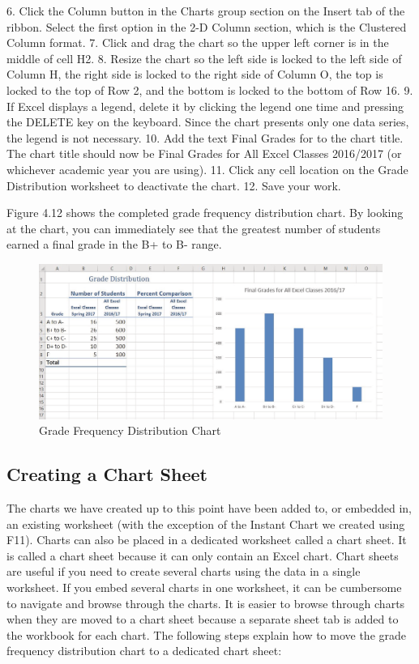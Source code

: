 6. Click the Column button in the Charts group section on the Insert tab of the ribbon. Select the
first option in the 2-D Column section, which is the Clustered Column format.
7. Click and drag the chart so the upper left corner is in the middle of cell H2.
8. Resize the chart so the left side is locked to the left side of Column H, the right side is locked to
the right side of Column O, the top is locked to the top of Row 2, and the bottom is locked to the
bottom of Row 16.
9. If Excel displays a legend, delete it by clicking the legend one time and pressing the DELETE key
on the keyboard. Since the chart presents only one data series, the legend is not necessary.
10. Add the text Final Grades for to the chart title. The chart title should now be Final Grades for
All Excel Classes 2016/2017 (or whichever academic year you are using).
11. Click any cell location on the Grade Distribution worksheet to deactivate the chart.
12. Save your work.

Figure 4.12 shows the completed grade frequency distribution chart. By looking at the chart, you can
immediately see that the greatest number of students earned a final grade in the B+ to B- range.


\begin{figure}[H]
	\centering
	\includegraphics[width=\maxwidth{.95\linewidth}]{gfx/ch04_fig13}
	\caption{Grade Frequency Distribution Chart}
	\label{04:fig13}
\end{figure}

\subsection{Creating a Chart Sheet}

The charts we have created up to this point have been added to, or embedded in, an existing
worksheet (with the exception of the Instant Chart we created using F11). Charts can also be placed
in a dedicated worksheet called a chart sheet. It is called a chart sheet because it can only contain an
Excel chart. Chart sheets are useful if you need to create several charts using the data in a single
worksheet. If you embed several charts in one worksheet, it can be cumbersome to navigate and
browse through the charts. It is easier to browse through charts when they are moved to a chart
sheet because a separate sheet tab is added to the workbook for each chart. The following steps
explain how to move the grade frequency distribution chart to a dedicated chart sheet:




